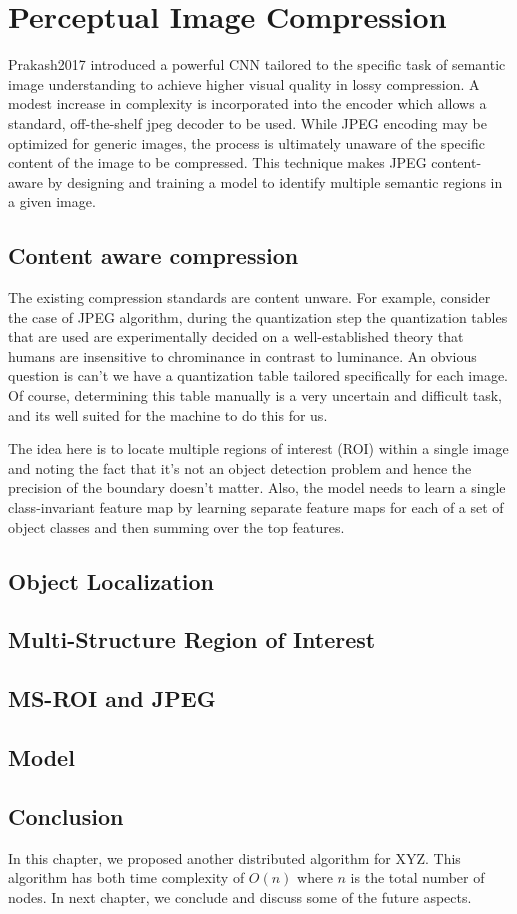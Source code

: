 \chapter{Perceptual Image Compression}

Prakash2017 \cite{Prakash2017} introduced a powerful CNN
tailored to the specific task of semantic image understanding to achieve higher visual quality in lossy compression. A modest increase in complexity is incorporated into the encoder which allows a standard, off-the-shelf jpeg decoder to be used. While JPEG encoding may be optimized for generic images, the process is ultimately unaware of the specific content of the image to be compressed. This technique makes JPEG content-aware by designing and training a model to identify multiple semantic regions in a given image.


\section{Content aware compression}

The existing compression standards are content unware. For example, consider the case of JPEG algorithm, during the quantization step the quantization tables that are used are experimentally decided on a well-established theory that humans are insensitive to chrominance in contrast to luminance. An obvious question is can't we have a quantization table tailored specifically for each image. Of course, determining this table manually is a very uncertain and difficult task, and its well suited for the machine to do this for us.

The idea here is to locate multiple regions of interest (ROI) within a single image and noting the fact that it's not an object detection problem and hence the precision of the boundary doesn't matter. Also, the model needs to learn a single class-invariant feature map by learning separate feature maps for each of a set of object classes and then summing over the top features.

\section{Object Localization}


\section{Multi-Structure Region of Interest}


\section{MS-ROI and JPEG}


\section{Model}

\section{Conclusion}
In this chapter, we proposed another distributed algorithm for
XYZ. This algorithm has both time complexity of $O(n)$ where $n$
is the total number of nodes.  In next chapter, we conclude and
discuss some of the future aspects.

